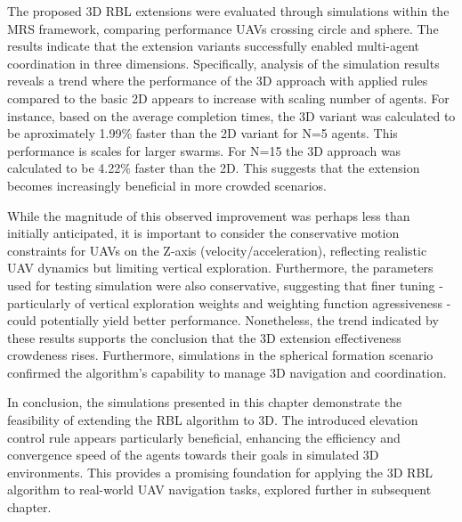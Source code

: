         The proposed \ac{3D} RBL extensions were evaluated through simulations within the MRS framework, comparing performance \ac{UAV}s crossing circle and sphere. 
        The results indicate that the extension variants successfully enabled multi-agent coordination in three dimensions.
        Specifically, analysis of the simulation results reveals a trend where the performance of the \ac{3D} approach with applied rules compared to the basic \ac{2D} appears to increase with scaling number of agents. 
        For instance, based on the average completion times, the \ac{3D} variant was calculated to be aproximately 1.99\% faster than the \ac{2D} variant for N=5 agents.
        This performance is scales for larger swarms.
        For N=15 the \ac{3D} approach was calculated to be 4.22\% faster than the \ac{2D}.
        This suggests that the extension becomes increasingly beneficial in more crowded scenarios.

        While the magnitude of this observed improvement was perhaps less than initially anticipated, it is important to consider the conservative motion constraints for \ac{UAV}s on the Z-axis (velocity/acceleration), reflecting realistic \ac{UAV} dynamics but limiting vertical exploration.
        Furthermore, the parameters used for testing simulation were also conservative, suggesting that finer tuning - particularly of vertical exploration weights and weighting function agressiveness - could potentially yield better performance.
        Nonetheless, the trend indicated by these results supports the conclusion that the \ac{3D} extension effectiveness crowdeness rises.
        Furthermore, simulations in the spherical formation scenario confirmed the algorithm's capability to manage \ac{3D} navigation and coordination.

        In conclusion, the simulations presented in this chapter demonstrate the feasibility of extending the RBL algorithm to \ac{3D}. 
        The introduced elevation control rule appears particularly beneficial, enhancing the efficiency and convergence speed of the agents towards their goals in simulated \ac{3D} environments. 
        This provides a promising foundation for applying the \ac{3D} RBL algorithm to real-world UAV navigation tasks, explored further in subsequent chapter.
    
